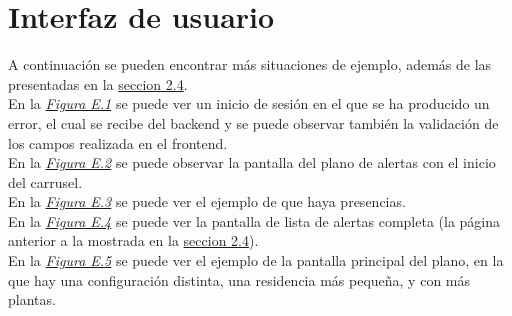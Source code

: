 \chapter{Interfaz de usuario}
\label{anexo-e}

A continuación se pueden encontrar más situaciones de ejemplo, además de las presentadas en la \hyperref[section-ui]{seccion 2.4}.\\

En la \hyperref[fig:login-error]{\textit{Figura E.1}} se puede ver un inicio de sesión en el que se ha producido un error, el cual se recibe del backend y se puede observar también la validación de los campos realizada en el frontend.\\

En la \hyperref[fig:map-carrusel]{\textit{Figura E.2}} se puede observar la pantalla del plano de alertas con el inicio del carrusel.\\

En la \hyperref[fig:map-presencias]{\textit{Figura E.3}} se puede ver el ejemplo de que haya presencias.\\

En la \hyperref[fig:list-completa]{\textit{Figura E.4}} se puede ver la pantalla de lista de alertas completa (la página anterior a la mostrada en la \hyperref[section-ui]{seccion 2.4}).\\

En la \hyperref[fig:map-configuracion]{\textit{Figura E.5}} se puede ver el ejemplo de la pantalla principal del plano, en la que hay una configuración distinta, una residencia más pequeña, y con más plantas.\\


